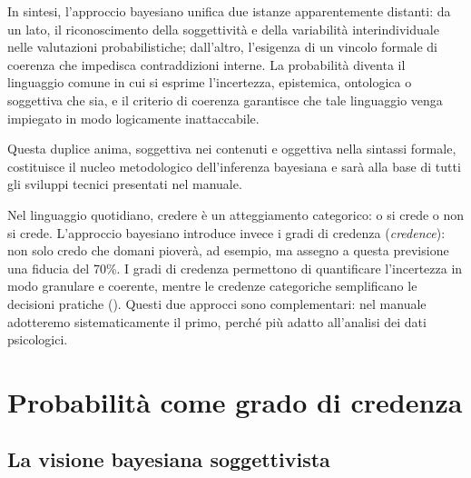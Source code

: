 \documentclass[
  italian,
  letterpaper,
  a4paper,
  11pt,
  open=any]{scrbook}
\theoremstyle{plain}
\theoremstyle{definition}
\theoremstyle{definition}
\theoremstyle{remark}
\begin{document}
In sintesi, l'approccio bayesiano unifica due istanze apparentemente
distanti: da un lato, il riconoscimento della soggettività e della
variabilità interindividuale nelle valutazioni probabilistiche;
dall'altro, l'esigenza di un vincolo formale di coerenza che impedisca
contraddizioni interne. La probabilità diventa il linguaggio comune in
cui si esprime l'incertezza, epistemica, ontologica o soggettiva che
sia, e il criterio di coerenza garantisce che tale linguaggio venga
impiegato in modo logicamente inattaccabile.

Questa duplice anima, soggettiva nei contenuti e oggettiva nella
sintassi formale, costituisce il nucleo metodologico dell'inferenza
bayesiana e sarà alla base di tutti gli sviluppi tecnici presentati nel
manuale.

\begin{tcolorbox}[enhanced jigsaw, arc=.35mm, bottomrule=.15mm, bottomtitle=1mm, breakable, colback=white, colbacktitle=quarto-callout-note-color!10!white, colframe=quarto-callout-note-color-frame, coltitle=black, left=2mm, leftrule=.75mm, opacityback=0, opacitybacktitle=0.6, rightrule=.15mm, title=\textcolor{quarto-callout-note-color}{\faInfo}\hspace{0.5em}{Credere e avere fiducia: due concetti distinti?}, titlerule=0mm, toprule=.15mm, toptitle=1mm]

Nel linguaggio quotidiano, credere è un atteggiamento categorico: o si
crede o non si crede. L'approccio bayesiano introduce invece i gradi di
credenza (\emph{credence}): non solo credo che domani pioverà, ad
esempio, ma assegno a questa previsione una fiducia del 70\%. I gradi di
credenza permettono di quantificare l'incertezza in modo granulare e
coerente, mentre le credenze categoriche semplificano le decisioni
pratiche (). Questi
due approcci sono complementari: nel manuale adotteremo sistematicamente
il primo, perché più adatto all'analisi dei dati psicologici.

\end{tcolorbox}

\section{Probabilità come grado di
credenza}\label{probabilituxe0-come-grado-di-credenza}

\subsection{La visione bayesiana
soggettivista}\label{la-visione-bayesiana-soggettivista}
\end{document}
